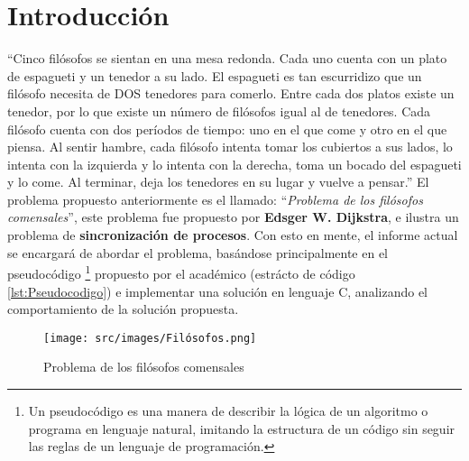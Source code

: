 \section{Introducción} \label{sec:Introduccion}
``Cinco filósofos se sientan en una mesa redonda. Cada uno cuenta con un plato de espagueti y un tenedor a su lado. El espagueti es tan escurridizo que un filósofo necesita de DOS tenedores para comerlo. Entre cada dos platos existe un tenedor, por lo que existe un número de filósofos igual al de tenedores. Cada filósofo cuenta con dos períodos de tiempo: uno en el que come y otro en el que piensa. Al sentir hambre, cada filósofo intenta tomar los cubiertos a sus lados, lo intenta con la izquierda y lo intenta con la derecha, toma un bocado del espagueti y lo come. Al terminar, deja los tenedores en su lugar y vuelve a pensar.'' El problema propuesto anteriormente es el llamado: ``\textit{Problema de los filósofos comensales}'', este problema fue propuesto por \textbf{Edsger W. Dijkstra}, e ilustra un problema de \textbf{sincronización de procesos}.
Con esto en mente, el informe actual se encargará de abordar el problema, basándose principalmente en el pseudocódigo \footnote{Un pseudocódigo es una manera de describir la lógica de un algoritmo o programa en lenguaje natural, imitando la estructura de un código sin seguir las reglas de un lenguaje de programación.} propuesto por el académico (estrácto de código \ref{lst:Pseudocodigo}) e implementar una solución en lenguaje C, analizando el comportamiento de la solución propuesta.

\begin{figure}[!ht]
    \centering
    \texttt{[image: src/images/Filósofos.png]}
    \caption{Problema de los filósofos comensales}
    \label{fig:Problema_de_los_filosofos}
\end{figure}